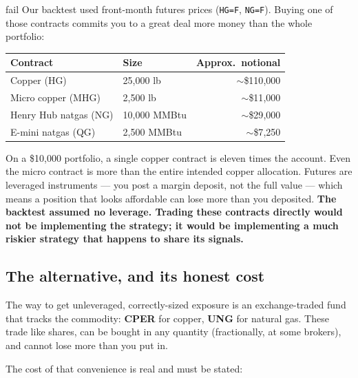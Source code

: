 \documentclass[11pt,a4paper]{article}
\begin{document}
\begin{resultbox}{fail}
Our backtest used front-month futures prices (\texttt{HG=F},
\texttt{NG=F}). Buying one of those contracts commits you to a great
deal more money than the whole portfolio:

\vspace{0.5em}
\centering
\begin{tabular}{@{}llr@{}}
    \toprule
    \textbf{Contract} & \textbf{Size} & \textbf{Approx.\ notional} \\
    \midrule
    Copper (HG)             & 25{,}000 lb    & $\sim$\$110{,}000 \\
    Micro copper (MHG)      & 2{,}500 lb     & $\sim$\$11{,}000 \\
    Henry Hub natgas (NG)   & 10{,}000 MMBtu & $\sim$\$29{,}000 \\
    E-mini natgas (QG)      & 2{,}500 MMBtu  & $\sim$\$7{,}250 \\
    \bottomrule
\end{tabular}

\vspace{0.5em}
\raggedright
On a \$10{,}000 portfolio, a single copper contract is eleven times
the account. Even the micro contract is more than the entire intended
copper allocation. Futures are leveraged instruments --- you post a
margin deposit, not the full value --- which means a position that
looks affordable can lose more than you deposited. \textbf{The
backtest assumed no leverage. Trading these contracts directly would
not be implementing the strategy; it would be implementing a much
riskier strategy that happens to share its signals.}
\end{resultbox}

\subsection{The alternative, and its honest cost}

The way to get unleveraged, correctly-sized exposure is an
exchange-traded fund that tracks the commodity: \textbf{CPER} for
copper, \textbf{UNG} for natural gas. These trade like shares, can be
bought in any quantity (fractionally, at some brokers), and cannot lose
more than you put in.

The cost of that convenience is real and must be stated:
\end{document}
